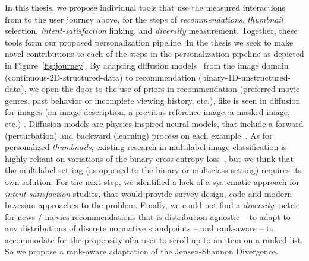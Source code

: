 
In this thesis, we propose individual tools that use the measured interactions from to the user journey above, for the steps of \emph{recommendations}, \emph{thumbnail} selection, \emph{intent-satisfaction} linking, and \emph{diversity} measurement. 
Together, these tools form our proposed personalization pipeline. In the thesis we seek to make novel contributions to each of the steps in the personalization pipeline as depicted in Figure~\ref{fig:journey}.
By adapting diffusion models~\cite{jascha} from the image domain (continuous-2D-structured-data) to recommendation (binary-1D-unstructured-data), we open the door to the use of priors in recommendation (preferred movie genres, past behavior or incomplete viewing history, etc.), like is seen in diffusion for images (an image description, a previous reference image, a masked image, etc.) . Diffusion models are physics inspired neural models, that include a forward (perturbation) and backward (learning) process on each example~\cite{jascha}. As for personalized \emph{thumbnails}, existing research in multilabel image classification is highly reliant on variations of the binary cross-entropy loss~\cite{fisher}, but we think that the multilabel setting (as opposed to the binary or multiclass setting) requires its own solution. For the next step, we identified a lack of a systematic approach for \emph{intent-satisfaction} studies, that would provide survey design, code and modern bayesian approaches to the problem. Finally, we could not find a \emph{diversity} metric for news / movies recommendations that is distribution agnostic -- to adapt to any distributions of discrete normative standpoints -- and rank-aware -- to accommodate for the propensity of a user to scroll up to an item on a ranked list. So we propose a rank-aware adaptation of the Jensen-Shannon Divergence.


